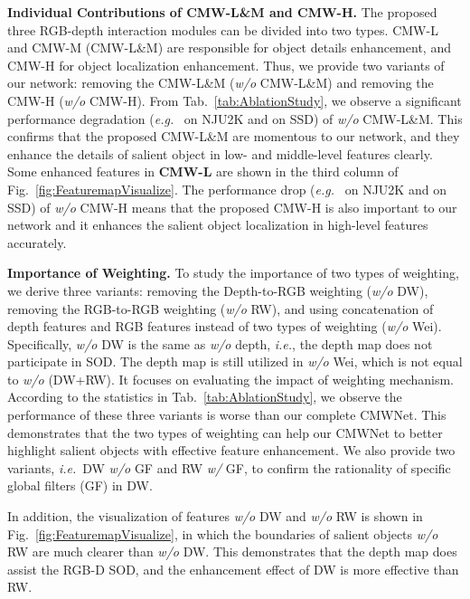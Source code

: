 \documentclass[runningheads]{llncs}
\newcommand{\eg}{\emph{e.g.}}
\newcommand{\ie}{\emph{i.e.}}
\begin{document}
\noindent\textbf{Individual Contributions of CMW-L\&M and CMW-H.}
The proposed three RGB-depth interaction modules can be divided into two types.
CMW-L and CMW-M (CMW-L\&M) are responsible for object details enhancement, and
CMW-H for object localization enhancement.
Thus, we provide two variants of our network:
removing the CMW-L\&M (\textit{w/o} CMW-L\&M) and
removing the CMW-H (\textit{w/o} CMW-H).
From Tab.~\ref{tab:AblationStudy}, we observe a significant performance degradation
(\eg~ on NJU2K and
 on SSD) of \textit{w/o} CMW-L\&M.
This confirms that the proposed CMW-L\&M are momentous to our network, and they enhance
the details of salient object in low- and middle-level features clearly.
Some enhanced features in \textbf{CMW-L} are shown in the third column of
Fig.~\ref{fig:FeaturemapVisualize}.
The performance drop (\eg~ on NJU2K
and  on SSD)
of \textit{w/o} CMW-H means that the proposed CMW-H is also important to our network
and it enhances the salient object localization in high-level features accurately.



\noindent\textbf{Importance of Weighting.}
To study the importance of two types of weighting, we derive three variants:
removing the Depth-to-RGB weighting (\textit{w/o} DW),
removing the RGB-to-RGB weighting (\textit{w/o} RW),
and using concatenation of depth features and RGB features instead of
two types of weighting (\textit{w/o} Wei).
Specifically, \textit{w/o} DW is the same as \textit{w/o} depth, \ie,
the depth map does not participate in SOD.
The depth map is still utilized in \textit{w/o} Wei, which is not equal to \textit{w/o} (DW+RW).
It focuses on evaluating the impact of weighting mechanism.
According to the statistics in Tab.~\ref{tab:AblationStudy},
we observe the performance of these three variants is
worse than our complete CMWNet.
This demonstrates that the two types of weighting can help our CMWNet to
better highlight salient objects with effective feature enhancement.
We also provide two variants, \ie~DW \textit{w/o} GF and RW \textit{w/} GF,
to confirm the rationality of specific global filters (GF) in DW.


In addition, the visualization of features \textit{w/o} DW and
\textit{w/o} RW is shown in Fig.~\ref{fig:FeaturemapVisualize},
in which the boundaries of salient objects \textit{w/o} RW are
much clearer than \textit{w/o} DW.
This demonstrates that the depth map does assist the RGB-D SOD,
and the enhancement effect of DW is more effective than RW.
\end{document}
